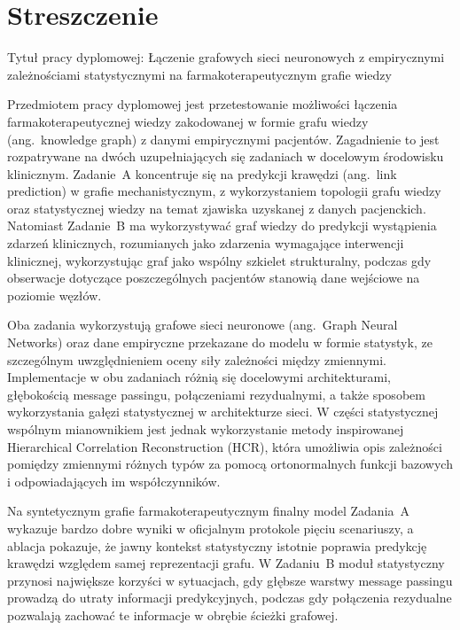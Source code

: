 \chapter*{Streszczenie}

Tytuł pracy dyplomowej: Łączenie grafowych sieci neuronowych z empirycznymi 
zależnościami statystycznymi na farmakoterapeutycznym grafie wiedzy

\noindent
Przedmiotem pracy dyplomowej jest przetestowanie możliwości łączenia farmakoterapeutycznej 
wiedzy zakodowanej w formie grafu wiedzy (ang.\ knowledge graph) 
z danymi empirycznymi pacjentów. 
Zagadnienie to jest rozpatrywane na dwóch uzupełniających się zadaniach
w docelowym środowisku klinicznym.
Zadanie~A koncentruje się na predykcji krawędzi (ang.\ link prediction) w grafie mechanistycznym, 
z wykorzystaniem topologii grafu wiedzy oraz statystycznej wiedzy na temat zjawiska uzyskanej z 
danych pacjenckich.
Natomiast Zadanie~B ma wykorzystywać graf wiedzy do predykcji wystąpienia zdarzeń klinicznych, 
rozumianych jako zdarzenia wymagające interwencji klinicznej, wykorzystując graf jako 
wspólny szkielet strukturalny, podczas gdy obserwacje dotyczące poszczególnych pacjentów stanowią 
dane wejściowe na poziomie węzłów.

Oba zadania wykorzystują grafowe sieci neuronowe (ang.\ Graph Neural Networks) oraz dane empiryczne 
przekazane do modelu w formie statystyk, ze szczególnym uwzględnieniem oceny siły zależności między zmiennymi.
Implementacje w obu zadaniach różnią się docelowymi architekturami, głębokością message passingu, 
połączeniami rezydualnymi, a także sposobem wykorzystania gałęzi statystycznej w architekturze sieci.
W części statystycznej wspólnym mianownikiem jest jednak wykorzystanie metody inspirowanej Hierarchical Correlation 
Reconstruction (HCR), która umożliwia opis zależności pomiędzy zmiennymi różnych typów za pomocą 
ortonormalnych funkcji bazowych i odpowiadających im współczynników.

Na syntetycznym grafie farmakoterapeutycznym finalny model Zadania~A wykazuje bardzo dobre wyniki 
w oficjalnym protokole pięciu scenariuszy, a ablacja pokazuje, że jawny kontekst statystyczny 
istotnie poprawia predykcję krawędzi względem samej reprezentacji grafu.
W Zadaniu~B moduł statystyczny przynosi największe korzyści w sytuacjach, gdy głębsze 
warstwy message passingu prowadzą do utraty informacji predykcyjnych, 
podczas gdy połączenia rezydualne pozwalają zachować te informacje w obrębie ścieżki grafowej.


